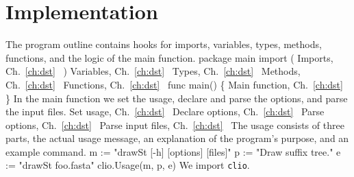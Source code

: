 \section*{Implementation}
The program outline contains hooks for imports, variables, types,
methods, functions, and the logic of the main function.
\nwenddocs{}\endmoddef\nwstartdeflinemarkup\nwenddeflinemarkup
package main
import (
          \LA{}Imports, Ch.~\ref{ch:dst}~{\nwtagstyle{}}\RA{}
)
\LA{}Variables, Ch.~\ref{ch:dst}~{\nwtagstyle{}}\RA{}
\LA{}Types, Ch.~\ref{ch:dst}~{\nwtagstyle{}}\RA{}
\LA{}Methods, Ch.~\ref{ch:dst}~{\nwtagstyle{}}\RA{}
\LA{}Functions, Ch.~\ref{ch:dst}~{\nwtagstyle{}}\RA{}
func main() \{
          \LA{}Main function, Ch.~\ref{ch:dst}~{\nwtagstyle{}}\RA{}
\}
\nwendcode{}\nwdocspar
In the main function we set the usage, declare and parse the options,
and parse the input files.
\nwenddocs{}\endmoddef\nwstartdeflinemarkup{}\nwenddeflinemarkup
\LA{}Set usage, Ch.~\ref{ch:dst}~{\nwtagstyle{}}\RA{}
\LA{}Declare options, Ch.~\ref{ch:dst}~{\nwtagstyle{}}\RA{}
\LA{}Parse options, Ch.~\ref{ch:dst}~{\nwtagstyle{}}\RA{}
\LA{}Parse input files, Ch.~\ref{ch:dst}~{\nwtagstyle{}}\RA{}
\nwendcode{}\nwdocspar
The usage consists of three parts, the actual usage message, an
explanation of the program's purpose, and an example command.
\nwenddocs{}\endmoddef\nwstartdeflinemarkup{}\nwenddeflinemarkup
m := "drawSt [-h] [options] [files]"
p := "Draw suffix tree."
e := "drawSt foo.fasta"
clio.Usage(m, p, e)
\nwendcode{}\nwdocspar
We import \texttt{clio}.
